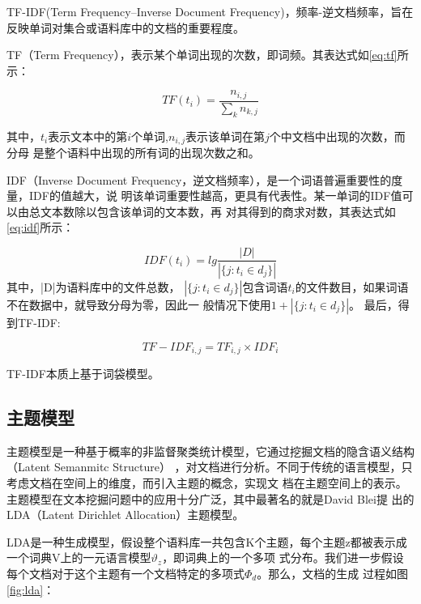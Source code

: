 TF-IDF(Term Frequency–Inverse Document Frequency)\cite{ramos2003using}，频率-逆文档频率，旨在反映单词对集合或语料库中的文档的重要程度。

TF（Term Frequency），表示某个单词出现的次数，即词频。其表达式如\ref{eq:tf}所示：

\begin{equation}
  \label{eq:tf}
  TF(t_i) = \frac{n_{i, j}}{\sum_k{n_{k,j}}}
\end{equation}

其中，$t_i$表示文本中的第$i$个单词,$n_{i,j}$表示该单词在第$j$个中文档中出现的次数，而分母
是整个语料中出现的所有词的出现次数之和。

IDF（Inverse Document Frequency，逆文档频率），是一个词语普遍重要性的度量，IDF的值越大，说
明该单词重要性越高，更具有代表性。某一单词的IDF值可以由总文本数除以包含该单词的文本数，再
对其得到的商求对数，其表达式如\ref{eq:idf}所示：

\begin{equation}
  \label{eq:idf}
  IDF(t_i) = lg{\frac{|D|}{|\{j:t_i \in d_j\}|}}
\end{equation}
其中，|D|为语料库中的文件总数，
$|\{j:t_i \in d_j\}|$包含词语$t_i$的文件数目，如果词语不在数据中，就导致分母为零，因此一
般情况下使用$1+|\{j:t_i \in d_j\}|$。
最后，得到TF-IDF:

\begin{equation}
  \label{eq:tf-idf}
  TF-IDF_{i,j} = TF_{i,j} × IDF_{i}
\end{equation}

TF-IDF本质上基于词袋模型。

 \subsection{主题模型}           
主题模型是一种基于概率的非监督聚类统计模型，它通过挖掘文档的隐含语义结构（Latent Semanmitc Structure）
，对文档进行分析。不同于传统的语言模型，只考虑文档在空间上的维度，而引入主题的概念，实现文
档在主题空间上的表示。主题模型在文本挖掘问题中的应用十分广泛，其中最著名的就是David Blei提
出的LDA（Latent Dirichlet Allocation）主题模型\cite{blei2003latent}。

LDA是一种生成模型，假设整个语料库一共包含K个主题，每个主题z都被表示成一个词典V上的一元语言模型$\vartheta_{z}$，即词典上的一个多项
式分布。我们进一步假设每个文档对于这个主题有一个文档特定的多项式$\varPhi_{d}$。那么，文档的生成
过程如图\ref{fig:lda}：

